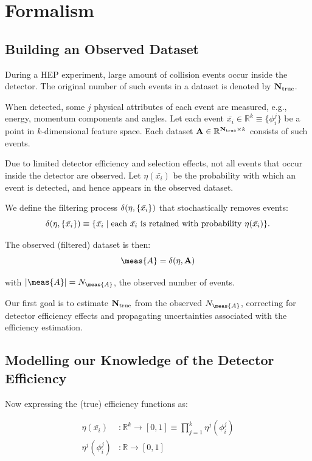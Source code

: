 \documentclass[../../ddppaper3.tex]{subfiles}
\begin{document}
\section{Formalism}

\subsection{Building an Observed Dataset}
\label{sec:building_an_observed_dataset}

During a HEP experiment, large amount of collision events occur inside the detector. The original number of such events in a dataset is denoted by ${{\mathbf{N}}}_{\text{true}}$.

When detected, some $j$ physical attributes of each event are measured, e.g., energy, momentum components and angles. Let each event \( \bar{x_i} \in \mathbb{R}^k \equiv \{\phi^j_i\}\) be a point in \( k \)-dimensional feature space. Each dataset \(\mathbf{A} \in \mathbb{R}^{{{\mathbf{N}}}_{\text{true}} \times k}\) consists of such events.

Due to limited detector efficiency and selection effects, not all events that occur inside the detector are observed. Let $\eta(\bar{x_i})$ be the probability with which an event is detected, and hence appears in the observed dataset.

We define the filtering process \(\delta(\eta, \{\bar{x_i}\})\) that stochastically removes events:
\[
\delta(\eta, \{\bar{x_i}\}) \equiv \{ \bar{x_i} \mid \text{each } \bar{x_i} \text{ is retained with probability } \eta(\bar{x_i}) \}.
\]

The observed (filtered) dataset is then:
\[
\meas{A} = \detector(\eta, \dataset{A})
\]

with $|\meas{A}| = N_\meas{A}$, the observed number of events.

Our first goal is to estimate \( {{\mathbf{N}}}_{\text{true}} \) from the observed \( N_\meas{A} \), correcting for detector efficiency effects and propagating uncertainties associated with the efficiency estimation.

\subsection{Modelling our Knowledge of the Detector Efficiency}

Now expressing the (true) efficiency functions as:

\begin{align*}
    \eta(\bar{x_i}) &: \mathbb{R}^k \to [0,1] \equiv \prod_{j=1}^k \eta^j(\phi_i^j) \\
    \eta^j(\phi_i^j) &: \mathbb{R} \to [0,1]
\end{align*}
\end{document}
